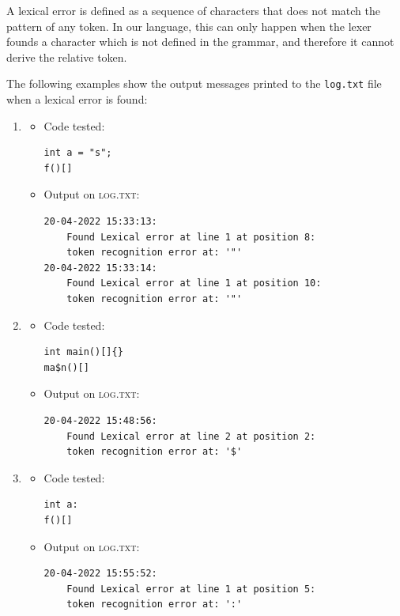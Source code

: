 \documentclass[11pt]{article} %
\begin{document}
\medskip

A lexical error is defined as a sequence of characters that does not match the pattern of any token. In our language, this can only happen when the lexer founds a character which is not defined in the grammar, and therefore it cannot derive the relative token. 

\medskip

The following examples show the output messages printed to the \verb|log.txt| file when a lexical error is found:
\begin{enumerate}
\item
	\begin{itemize}
		\item Code tested: \begin{lstlisting}
int a = "s";   
f()[]
		\end{lstlisting}
		\item Output on \textsc{log.txt}: \begin{lstlisting}
20-04-2022 15:33:13: 
    Found Lexical error at line 1 at position 8: 
    token recognition error at: '"'
20-04-2022 15:33:14: 
    Found Lexical error at line 1 at position 10: 
    token recognition error at: '"'
		\end{lstlisting}
	\end{itemize}
\item
\begin{itemize}
\item Code tested: \begin{lstlisting}
int main()[]{}
ma$n()[]
\end{lstlisting}
\item Output on \textsc{log.txt}: \begin{lstlisting}
20-04-2022 15:48:56: 
    Found Lexical error at line 2 at position 2: 
    token recognition error at: '$'
\end{lstlisting}
\end{itemize}
\item
	\begin{itemize}
	\item Code tested: \begin{lstlisting}
int a:
f()[]
	\end{lstlisting}
	\item Output on \textsc{log.txt}: \begin{lstlisting}
20-04-2022 15:55:52: 
    Found Lexical error at line 1 at position 5: 
    token recognition error at: ':'
	\end{lstlisting}
	\end{itemize}
\end{enumerate}
\end{document}
